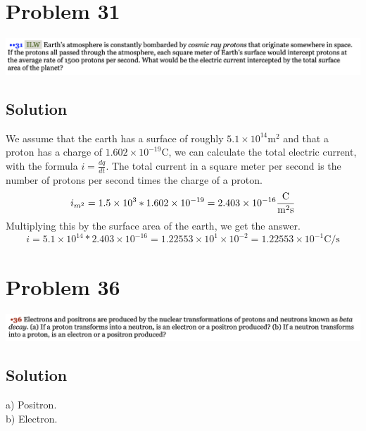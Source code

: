 \documentclass[12pt]{article}
\begin{document}
\pagebreak
\section*{Problem 31}
\includegraphics[width=\textwidth]{picture_7.png} 

\subsection*{Solution}
We assume that the earth has a surface of roughly $5.1 \times 10^{14} \unit{\meter^2}$ and that a proton has a charge of $1.602 \times 10^{-19} \unit{\coulomb}$, we can calculate the total electric current, with the formula $i = \frac{dq}{dt}$. The total current in a square meter per second is the number of protons per second times the charge of a proton.
\begin{equation*}
    i_{m^2} = 1.5 \times 10^3 * 1.602 \times 10^{-19} = 2.403 \times 10^{-16} \unit{\frac{\coulomb}{\meter^2 \second}}
\end{equation*}
Multiplying this by the surface area of the earth, we get the answer.
\begin{equation*}
    i = 5.1 \times 10^{14} * 2.403 \times 10^{-16} = 1.22553 \times 10^1 \times 10^{-2} = \boxed{1.22553 \times 10^{-1} \unit{\coulomb/\second}}
\end{equation*}

\pagebreak
\section*{Problem 36}
\includegraphics[width=\textwidth]{picture_8.png} 

\subsection*{Solution}
a) Positron. \\
b) Electron.
\end{document}

